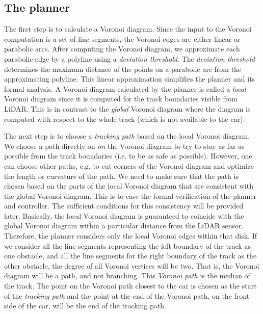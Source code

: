 \subsection{The planner}
\label{sec:voronoiplanner}

The first step is to calculate a Voronoi diagram.
%
Since the input to the Voronoi computation is a set of line segments, the Voronoi edges are either linear or parabolic arcs.
%
After computing the Voronoi diagram, we approximate each parabolic edge by a polyline using a \emph{deviation threshold}.
%
The \emph{deviation threshold} determines the maximum distance of the points on a parabolic arc from the approximating polyline.
%
This linear approximation simplifies the planner and its formal analysis.
%
A Voronoi diagram calculated by the planner is called a \emph{local} Voronoi diagram since it is computed for the track boundaries visible from LiDAR.
%
This is in contrast to the \emph{global} Voronoi diagram where the diagram is computed with respect to the whole track (which is not available to the car).


The next step is to choose a \emph{tracking path} based on the local Voronoi diagram.
%
We choose a path directly on \emph{on} the Voronoi diagram to try to stay as far as possible from the track boundaries (i.e. to be as safe as possible).
%
However, one can choose other paths, e.g. to cut corners of the Voronoi diagram and optimize the length or curvature of the path.
%
We need to make sure that the path is chosen based on the parts of the local Voronoi diagram that are consistent with the global Voronoi diagram. 
%
This is to ease the formal verification of the planner and controller.
%
The sufficient conditions for this consistency will be provided later.
%
Basically, the local Voronoi diagram is guaranteed to coincide with the global Voronoi diagram within a particular distance from the LiDAR sensor.
%
Therefore, the planner considers only the local Voronoi edges within that disk.
%
If we consider all the line segments representing the left boundary of the track as one obstacle, and all the line segments for the right boundary of the track as the other obstacle, the degree of all Voronoi vertices will be two.
%
That is, the Voronoi diagram will be a path, and not branching.
%
This \emph{Voronoi path} is the median of the track.
%
The point on the Voronoi path closest to the car is chosen as the start of the \emph{tracking path} and the point at the end of the Voronoi path, on the front side of the car, will be the end of the tracking path.
